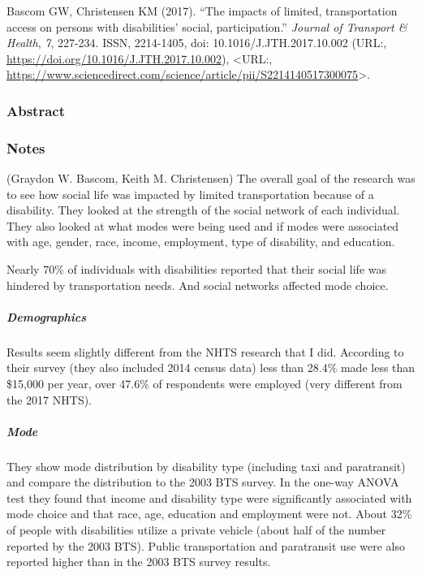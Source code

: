 \documentclass[
]{article}
\begin{document}
Bascom GW, Christensen KM (2017). ``The impacts of limited,
transportation access on persons with disabilities' social,
participation.'' \emph{Journal of Transport \& Health}, \emph{7},
227-234. ISSN, 2214-1405, doi: 10.1016/J.JTH.2017.10.002 (URL:,
\url{https://doi.org/10.1016/J.JTH.2017.10.002}), \textless URL:,
\url{https://www.sciencedirect.com/science/article/pii/S2214140517300075}\textgreater.

\hypertarget{abstract-28}{%
\subsubsection{Abstract}\label{abstract-28}}

\hypertarget{notes-28}{%
\subsubsection{Notes}\label{notes-28}}

(Graydon W. Bascom, Keith M. Christensen) The overall goal of the
research was to see how social life was impacted by limited
transportation because of a disability. They looked at the strength of
the social network of each individual. They also looked at what modes
were being used and if modes were associated with age, gender, race,
income, employment, type of disability, and education.

Nearly 70\% of individuals with disabilities reported that their social
life was hindered by transportation needs. And social networks affected
mode choice.

\hypertarget{demographics}{%
\subparagraph{Demographics}\label{demographics}}

Results seem slightly different from the NHTS research that I did.
According to their survey (they also included 2014 census data) less
than 28.4\% made less than \$15,000 per year, over 47.6\% of respondents
were employed (very different from the 2017 NHTS).

\hypertarget{mode}{%
\subparagraph{Mode}\label{mode}}

They show mode distribution by disability type (including taxi and
paratransit) and compare the distribution to the 2003 BTS survey. In the
one-way ANOVA test they found that income and disability type were
significantly associated with mode choice and that race, age, education
and employment were not. About 32\% of people with disabilities utilize
a private vehicle (about half of the number reported by the 2003 BTS).
Public transportation and paratransit use were also reported higher than
in the 2003 BTS survey results.
\end{document}
